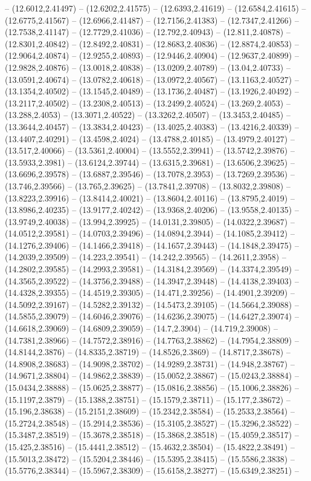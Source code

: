 {-- (12.6012,2.41497) -- (12.6202,2.41575) -- (12.6393,2.41619) -- (12.6584,2.41615) -- (12.6775,2.41567) -- (12.6966,2.41487) -- (12.7156,2.41383) -- (12.7347,2.41266) -- (12.7538,2.41147) -- (12.7729,2.41036) -- (12.792,2.40943) -- (12.811,2.40878) -- (12.8301,2.40842) -- (12.8492,2.40831) -- (12.8683,2.40836) -- (12.8874,2.40853) -- (12.9064,2.40874) -- (12.9255,2.40893) -- (12.9446,2.40904) -- (12.9637,2.40899) -- (12.9828,2.40876) -- (13.0018,2.40838) -- (13.0209,2.40789) -- (13.04,2.40733) -- (13.0591,2.40674) -- (13.0782,2.40618) -- (13.0972,2.40567) -- (13.1163,2.40527) -- (13.1354,2.40502) -- (13.1545,2.40489) -- (13.1736,2.40487) -- (13.1926,2.40492) -- (13.2117,2.40502) -- (13.2308,2.40513) -- (13.2499,2.40524) -- (13.269,2.4053) -- (13.288,2.4053) -- (13.3071,2.40522) -- (13.3262,2.40507) -- (13.3453,2.40485) -- (13.3644,2.40457) -- (13.3834,2.40423) -- (13.4025,2.40383) -- (13.4216,2.40339) -- (13.4407,2.40291) -- (13.4598,2.4024) -- (13.4788,2.40185) -- (13.4979,2.40127) -- (13.517,2.40066) -- (13.5361,2.40004) -- (13.5552,2.39941) -- (13.5742,2.39876) -- (13.5933,2.3981) -- (13.6124,2.39744) -- (13.6315,2.39681) -- (13.6506,2.39625) -- (13.6696,2.39578) -- (13.6887,2.39546) -- (13.7078,2.3953) -- (13.7269,2.39536) -- (13.746,2.39566) -- (13.765,2.39625) -- (13.7841,2.39708) -- (13.8032,2.39808) -- (13.8223,2.39916) -- (13.8414,2.40021) -- (13.8604,2.40116) -- (13.8795,2.4019) -- (13.8986,2.40235) -- (13.9177,2.40242) -- (13.9368,2.40206) -- (13.9558,2.40135) -- (13.9749,2.40038) -- (13.994,2.39925) -- (14.0131,2.39805) -- (14.0322,2.39687) -- (14.0512,2.39581) -- (14.0703,2.39496) -- (14.0894,2.3944) -- (14.1085,2.39412) -- (14.1276,2.39406) -- (14.1466,2.39418) -- (14.1657,2.39443) -- (14.1848,2.39475) -- (14.2039,2.39509) -- (14.223,2.39541) -- (14.242,2.39565) -- (14.2611,2.3958) -- (14.2802,2.39585) -- (14.2993,2.39581) -- (14.3184,2.39569) -- (14.3374,2.39549) -- (14.3565,2.39522) -- (14.3756,2.39488) -- (14.3947,2.39448) -- (14.4138,2.39403) -- (14.4328,2.39355) -- (14.4519,2.39305) -- (14.471,2.39256) -- (14.4901,2.39209) -- (14.5092,2.39167) -- (14.5282,2.39132) -- (14.5473,2.39105) -- (14.5664,2.39088) -- (14.5855,2.39079) -- (14.6046,2.39076) -- (14.6236,2.39075) -- (14.6427,2.39074) -- (14.6618,2.39069) -- (14.6809,2.39059) -- (14.7,2.3904) -- (14.719,2.39008) -- (14.7381,2.38966) -- (14.7572,2.38916) -- (14.7763,2.38862) -- (14.7954,2.38809) -- (14.8144,2.3876) -- (14.8335,2.38719) -- (14.8526,2.3869) -- (14.8717,2.38678) -- (14.8908,2.38683) -- (14.9098,2.38702) -- (14.9289,2.38731) -- (14.948,2.38767) -- (14.9671,2.38804) -- (14.9862,2.38839) -- (15.0052,2.38867) -- (15.0243,2.38884) -- (15.0434,2.38888) -- (15.0625,2.38877) -- (15.0816,2.38856) -- (15.1006,2.38826) -- (15.1197,2.3879) -- (15.1388,2.38751) -- (15.1579,2.38711) -- (15.177,2.38672) -- (15.196,2.38638) -- (15.2151,2.38609) -- (15.2342,2.38584) -- (15.2533,2.38564) -- (15.2724,2.38548) -- (15.2914,2.38536) -- (15.3105,2.38527) -- (15.3296,2.38522) -- (15.3487,2.38519) -- (15.3678,2.38518) -- (15.3868,2.38518) -- (15.4059,2.38517) -- (15.425,2.38516) -- (15.4441,2.38512) -- (15.4632,2.38504) -- (15.4822,2.38491) -- (15.5013,2.38472) -- (15.5204,2.38446) -- (15.5395,2.38415) -- (15.5586,2.3838) -- (15.5776,2.38344) -- (15.5967,2.38309) -- (15.6158,2.38277) -- (15.6349,2.38251) -- }

